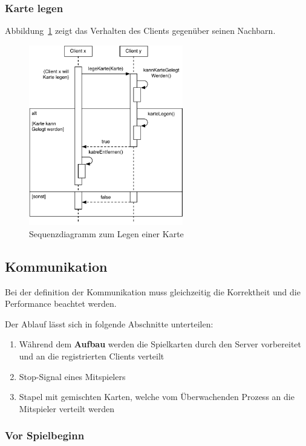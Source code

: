 \subsubsection{Karte legen}

Abbildung~\ref{SequenzdiagramClient} zeigt das Verhalten des Clients gegenüber seinen Nachbarn.

\begin{figure}[H]
  \centering
  \includegraphics[width=0.60\textwidth,angle=0]{graphics/KarteLegen.pdf}
  \caption{Sequenzdiagramm zum Legen einer Karte\hfill{} }
  \label{SequenzdiagramClient}
\end{figure}


\subsection{Kommunikation}

Bei der definition der Kommunikation muss gleichzeitig die Korrektheit und die Performance beachtet werden.

Der Ablauf lässt sich in folgende Abschnitte unterteilen:
\begin{enumerate}
	\item Während dem {\bf Aufbau} werden die Spielkarten durch den Server vorbereitet und an die registrierten Clients verteilt
	\item Stop-Signal eines Mitspielers
	\item Stapel mit gemischten Karten, welche vom Überwachenden Prozess an die Mitspieler verteilt werden
\end{enumerate}


\subsubsection{Vor Spielbeginn}

